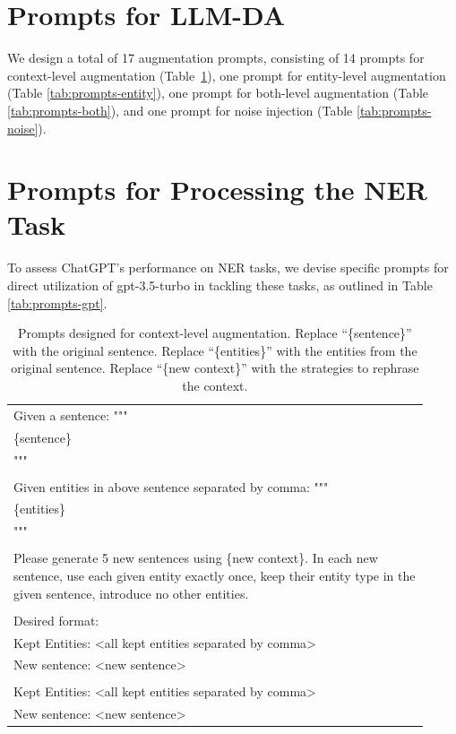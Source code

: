 \documentclass[11pt]{article}
\begin{document}
\section{Prompts for LLM-DA}
\label{appendix:prompts}



We design a total of 17 augmentation prompts, consisting of 14 prompts for context-level augmentation (Table~\ref{tab:prompts-context}), one prompt for entity-level augmentation (Table \ref{tab:prompts-entity}), one prompt for both-level augmentation (Table \ref{tab:prompts-both}), and one prompt for noise injection (Table \ref{tab:prompts-noise}).


\section{Prompts for Processing the NER Task}
\label{appendix:gpt}



To assess ChatGPT's performance on NER tasks, we devise specific prompts for direct utilization of gpt-3.5-turbo in tackling these tasks, as outlined in Table \ref{tab:prompts-gpt}.


\begin{table}[h]
\centering
    \begin{tabular}{m{0.92\linewidth}}
    \toprule
      Given a sentence: """ \\
\{sentence\}\\
"""\\
\\
Given entities in above sentence separated by comma: """\\
\{entities\}\\
"""\\
\\
Please generate 5 new sentences using \{new context\}. In each new sentence, use each given entity exactly once, keep their entity type in the given sentence, introduce no other entities.\\
\\
Desired format:\\
Kept Entities: <all kept entities separated by comma>\\
New sentence: <new sentence>\\
\\
Kept Entities: <all kept entities separated by comma>\\
New sentence: <new sentence>
\\ \bottomrule
\end{tabular}
\caption{Prompts designed for context-level augmentation. Replace ``\{sentence\}'' with the original sentence. Replace ``\{entities\}'' with the entities from the original sentence. Replace ``\{new context\}'' with the strategies to rephrase the context.}
\label{tab:prompts-context}
\end{table}
\end{document}
